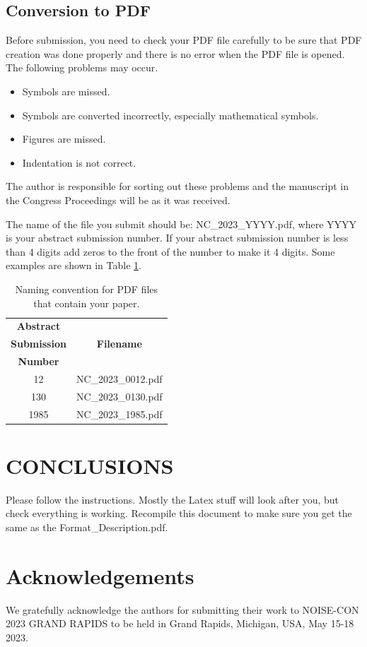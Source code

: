 \documentclass[letterpaper,12pt]{article}
\begin{document}
\subsection{Conversion to PDF}
\noindent
Before submission, you need to check your PDF file carefully to be sure that PDF creation was done properly and there is no error when the PDF file is opened. The following problems may occur.
\begin{itemize}[noitemsep]
\item
Symbols are missed.
\item
Symbols are converted incorrectly, especially mathematical symbols.
\item
Figures are missed.
\item
Indentation is not correct.
\end{itemize}

\noindent
The author is responsible for sorting out these problems and the manuscript  in the Congress Proceedings will be as it was received.

The name of the file you submit should be: NC\_2023\_YYYY.pdf, where YYYY is your abstract submission number. If your abstract submission number is less than 4 digits add zeros to the front of the number to make it 4 digits.  Some examples are shown in Table \ref{Tab:2}.
\begin{table}[h!]

\caption{Naming convention for PDF files that contain your paper.}
\label{Tab:2}

\begin{center}
\begin{tabular}{c c} 
 \hline
{\textbf{Abstract }} & \\
{\textbf{Submission}} & { \textbf{Filename}}\\
{\textbf{Number}} &\\
 \hline
 12 & NC\_2023\_0012.pdf  \\ 
 \hline
 130 & NC\_2023\_0130.pdf   \\
 \hline
 1985 & NC\_2023\_1985.pdf  \\ [1ex] 
 \hline
\end{tabular}
\end{center}
\end{table}

\section{CONCLUSIONS}

\noindent
Please follow the instructions.  Mostly the Latex stuff will look after you, but check everything is working. Recompile this document to make sure you get the same as the Format\_Description.pdf. 

\section*{Acknowledgements}
\noindent
We gratefully acknowledge the authors for submitting their work to NOISE-CON 2023 GRAND RAPIDS to be held in Grand Rapids, Michigan, USA, May 15-18 2023.


 
\end{document}
